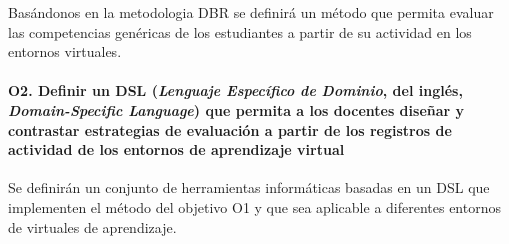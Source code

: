 Basándonos en la metodologia DBR se definirá un método que permita evaluar las competencias genéricas de los estudiantes a partir de su actividad en los entornos virtuales.

\paragraph*{O2. Definir un DSL (\emph{Lenguaje Específico de Dominio}, del inglés, \emph{Domain-Specific Language}) que permita a los docentes diseñar y contrastar estrategias de evaluación a partir de los registros de actividad de los entornos de aprendizaje virtual}

Se definirán un conjunto de herramientas informáticas basadas en un DSL que implementen el método del objetivo O1 y que sea aplicable a diferentes entornos de virtuales de aprendizaje.









